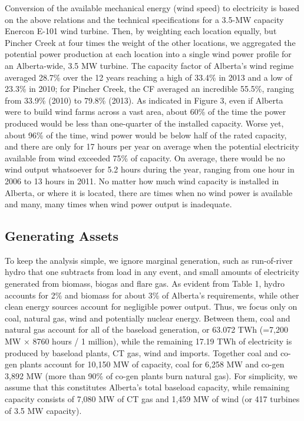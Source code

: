 Conversion of the available mechanical energy (wind speed) to electricity is based on the above relations and the technical specifications for a 3.5-MW capacity Enercon E-101 wind turbine.  Then, by weighting each location equally, but Pincher Creek at four times the weight of the other locations, we aggregated the potential power production at each location into a single wind power profile for an Alberta-wide, 3.5 MW turbine. The capacity factor of Alberta’s wind regime averaged 28.7\% over the 12 years reaching a high of 33.4\% in 2013 and a low of 23.3\% in 2010; for Pincher Creek, the CF averaged an incredible 55.5\%, ranging from 33.9\% (2010) to 79.8\% (2013).  As indicated in Figure 3, even if Alberta were to build wind farms across a vast area, about 60\% of the time the power produced would be less than one-quarter of the installed capacity. Worse yet, about 96\% of the time, wind power would be below half of the rated capacity, and there are only for 17 hours per year on average when the potential electricity available from wind exceeded 75\% of capacity. On average, there would be no wind output whatsoever for 5.2 hours during the year, ranging from one hour in 2006 to 13 hours in 2011. No matter how much wind capacity is installed in Alberta, or where it is located, there are times when no wind power is available and many, many times when wind power output is inadequate. 


\subsection{Generating Assets}




To keep the analysis simple, we ignore marginal generation, such as run-of-river hydro that one subtracts from load in any event, and small amounts of electricity generated from biomass, biogas and flare gas. As evident from Table 1, hydro accounts for 2\% and biomass for about 3\% of Alberta’s requirements, while other clean energy sources account for negligible power output. Thus, we focus only on coal, natural gas, wind and potentially nuclear energy. Between them, coal and natural gas account for all of the baseload generation, or 63.072 TWh (=7,200 MW × 8760 hours / 1 million), while the remaining 17.19 TWh of electricity is produced by baseload plants, CT gas, wind and imports. Together coal and co-gen plants account for 10,150 MW of capacity, coal for 6,258 MW and co-gen 3,892 MW (more than 90\% of co-gen plants burn natural gas). For simplicity, we assume that this constitutes Alberta’s total baseload capacity, while remaining capacity consists of 7,080 MW of CT gas and 1,459 MW of wind (or 417 turbines of 3.5 MW capacity). 










